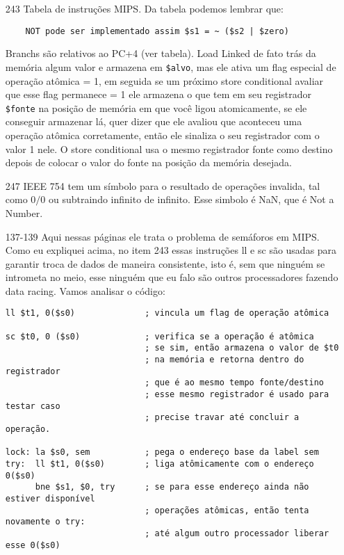 \documentclass{article}
\begin{document}
\begin{enumerate}
\item[243] Tabela de instruções MIPS. Da tabela podemos lembrar que:

  \begin{verbatim}
    NOT pode ser implementado assim $s1 = ~ ($s2 | $zero)
  \end{verbatim}

Branchs são relativos ao PC+4 (ver tabela).
Load Linked de fato trás da memória algum valor e armazena em \verb|$alvo|, mas 
ele ativa um flag especial de operação atômica = 1, em seguida se um próximo 
store conditional avaliar que esse flag permanece = 1 ele armazena o que tem em 
seu registrador \verb|$fonte| na posição de memória em que você ligou 
atomicamente, se ele conseguir armazenar lá, quer dizer que ele avaliou que 
aconteceu uma operação atômica corretamente, então ele sinaliza o seu 
registrador com o valor 1 nele. O store conditional usa o mesmo registrador 
fonte como destino depois de colocar o valor do fonte na posição da memória 
desejada.

\item[247] IEEE 754 tem um símbolo para o resultado de operações invalida, 
tal como $0/0$ ou subtraindo infinito de infinito. Esse simbolo é NaN, que é 
Not a Number.

\item[137-139] Aqui nessas páginas ele trata o problema de semáforos em MIPS. 
Como eu expliquei acima, no item 243 essas instruções ll e sc são usadas para 
garantir troca de dados de maneira consistente, isto é, sem que ninguém se 
intrometa no meio, esse ninguém que eu falo são outros processadores fazendo 
data racing. Vamos analisar o código:

\begin{verbatim}
ll $t1, 0($s0)              ; vincula um flag de operação atômica

sc $t0, 0 ($s0)             ; verifica se a operação é atômica
                            ; se sim, então armazena o valor de $t0
                            ; na memória e retorna dentro do registrador
                            ; que é ao mesmo tempo fonte/destino
                            ; esse mesmo registrador é usado para testar caso 
                            ; precise travar até concluir a operação.

lock: la $s0, sem           ; pega o endereço base da label sem
try:  ll $t1, 0($s0)        ; liga atômicamente com o endereço 0($s0)
      bne $s1, $0, try      ; se para esse endereço ainda não estiver disponível
                            ; operações atômicas, então tenta novamente o try:
                            ; até algum outro processador liberar esse 0($s0)


\end{verbatim}
\end{enumerate}
\end{document}
